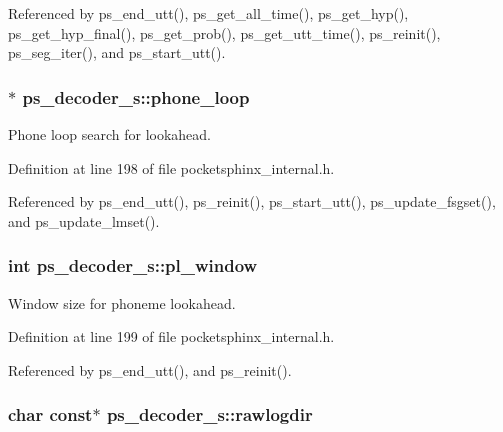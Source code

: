 Referenced by ps\-\_\-end\-\_\-utt(), ps\-\_\-get\-\_\-all\-\_\-time(), ps\-\_\-get\-\_\-hyp(), ps\-\_\-get\-\_\-hyp\-\_\-final(), ps\-\_\-get\-\_\-prob(), ps\-\_\-get\-\_\-utt\-\_\-time(), ps\-\_\-reinit(), ps\-\_\-seg\-\_\-iter(), and ps\-\_\-start\-\_\-utt().

\subsubsection[{phone\-\_\-loop}]{$\ast$ ps\-\_\-decoder\-\_\-s\-::phone\-\_\-loop}\label{structps__decoder__s_a0c6d141d7a71a1287be00a1ebcc7643d}


Phone loop search for lookahead. 



Definition at line 198 of file pocketsphinx\-\_\-internal.\-h.



Referenced by ps\-\_\-end\-\_\-utt(), ps\-\_\-reinit(), ps\-\_\-start\-\_\-utt(), ps\-\_\-update\-\_\-fsgset(), and ps\-\_\-update\-\_\-lmset().

\subsubsection[{pl\-\_\-window}]{\setlength{\rightskip}{0pt plus 5cm}int ps\-\_\-decoder\-\_\-s\-::pl\-\_\-window}\label{structps__decoder__s_a0f0a6681ffd98af789f6bed556c814e4}


Window size for phoneme lookahead. 



Definition at line 199 of file pocketsphinx\-\_\-internal.\-h.



Referenced by ps\-\_\-end\-\_\-utt(), and ps\-\_\-reinit().

\subsubsection[{rawlogdir}]{\setlength{\rightskip}{0pt plus 5cm}char const$\ast$ ps\-\_\-decoder\-\_\-s\-::rawlogdir}\label{structps__decoder__s_aa2610c52a9267ee18ca095169bf34bfd}


